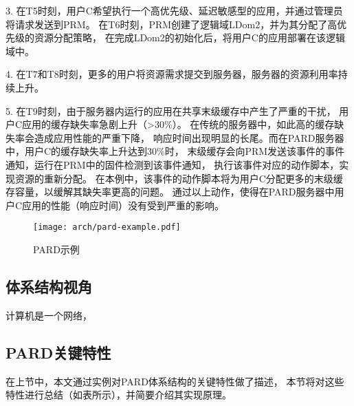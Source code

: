 3. 在T5时刻，用户C希望执行一个高优先级、延迟敏感型的应用，并通过管理员将请求发送到PRM。
在T6时刻，PRM创建了逻辑域LDom2，并为其分配了高优先级的资源分配策略，
在完成LDom2的初始化后，将用户C的应用部署在该逻辑域中。

4. 在T7和T8时刻，更多的用户将资源需求提交到服务器，服务器的资源利用率持续上升。

5. 在T9时刻，由于服务器内运行的应用在共享末级缓存中产生了严重的干扰，
用户C应用的缓存缺失率急剧上升（>30\%）。
在传统的服务器中，如此高的缓存缺失率会造成应用性能的严重下降，
响应时间出现明显的长尾。而在PARD服务器中，用户C的缓存缺失率上升达到30\%时，
末级缓存会向PRM发送该事件的事件通知，运行在PRM中的固件检测到该事件通知，
执行该事件对应的动作脚本，实现资源的重新分配。
在本例中，该事件的动作脚本将为用户C分配更多的末级缓存容量，以缓解其缺失率更高的问题。
通过以上动作，使得在PARD服务器中用户C应用的性能（响应时间）没有受到严重的影响。

\begin{figure}[t]
  \centering
  \texttt{[image: arch/pard-example.pdf]}
  \caption{PARD示例}
  \label{fig:pard-example}
\end{figure}


\subsection{体系结构视角}

计算机是一个网络，


\subsection{PARD关键特性}

在上节中，本文通过实例对PARD体系结构的关键特性做了描述，
本节将对这些特性进行总结（如表\cite{}所示），并简要介绍其实现原理。

